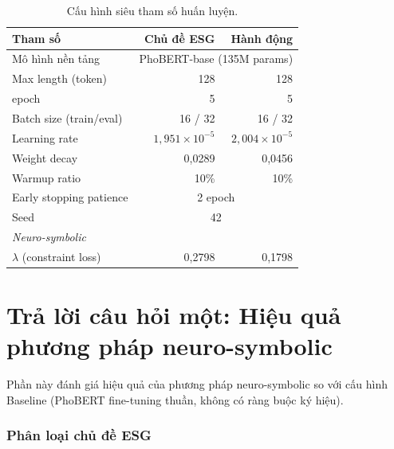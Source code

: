 \begin{table}[H]
\centering
\caption{Cấu hình siêu tham số huấn luyện.}
\label{tab:hyperparams}
\begin{tabular}{lrr}
\toprule
\textbf{Tham số} & \textbf{Chủ đề ESG} & \textbf{Hành động} \\
\midrule
Mô hình nền tảng        & \multicolumn{2}{c}{PhoBERT-base (135M params)} \\
Max length (token)   & 128  & 128  \\
epoch                & 5    & 5    \\
Batch size (train/eval) & 16 / 32 & 16 / 32 \\
Learning rate           & $1{,}951 \times 10^{-5}$ & $2{,}004 \times 10^{-5}$ \\
Weight decay            & 0,0289 & 0,0456 \\
Warmup ratio            & 10\%  & 10\%  \\
Early stopping patience & \multicolumn{2}{c}{2 epoch} \\
Seed                    & \multicolumn{2}{c}{42} \\
\midrule
\multicolumn{3}{l}{\textit{Neuro-symbolic}} \\
$\lambda$ (constraint loss) & 0,2798 & 0,1798 \\
\bottomrule
\end{tabular}
\end{table}

\section{Trả lời câu hỏi một: Hiệu quả phương pháp neuro-symbolic}
\label{sec:rq1}

Phần này đánh giá hiệu quả của phương pháp neuro-symbolic so với cấu hình Baseline (PhoBERT fine-tuning thuần, không có ràng buộc ký hiệu).


\subsubsection{Phân loại chủ đề ESG}
\label{subsec:topic_baseline_vs_neuro}


